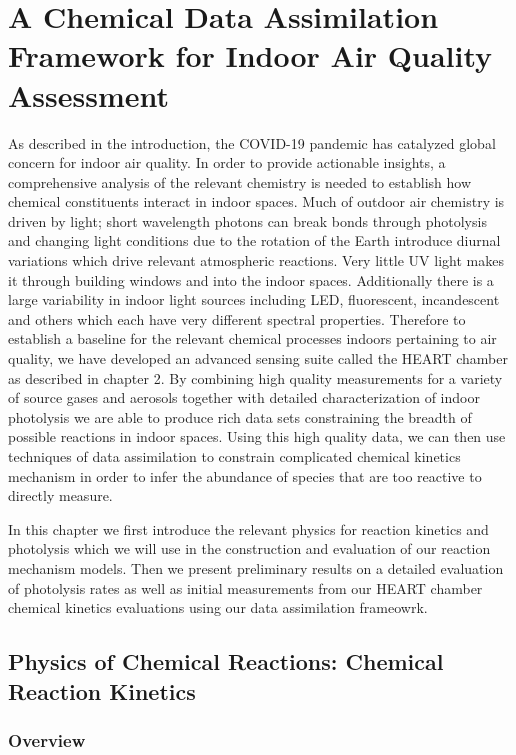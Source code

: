 \chapter{A Chemical Data Assimilation Framework for Indoor Air Quality Assessment}

As described in the introduction, the COVID-19 pandemic has catalyzed global concern for indoor air quality. In order to provide actionable insights, a comprehensive analysis of the relevant chemistry is needed to establish how chemical constituents interact in indoor spaces. Much of outdoor air chemistry is driven by light; short wavelength photons can break bonds through photolysis and changing light conditions due to the rotation of the Earth introduce diurnal variations which drive relevant atmospheric reactions. Very little UV light makes it through building windows and into the indoor spaces. Additionally there is a large variability in indoor light sources including LED, fluorescent, incandescent and others which each have very different spectral properties. Therefore to establish a baseline for the relevant chemical processes indoors pertaining to air quality, we have developed an advanced sensing suite called the HEART chamber as described in chapter 2. By combining high quality measurements for a variety of source gases and aerosols together with detailed characterization of indoor photolysis we are able to produce rich data sets constraining the breadth of possible reactions in indoor spaces. Using this high quality data, we can then use techniques of data assimilation to constrain complicated chemical kinetics mechanism in order to infer the abundance of species that are too reactive to directly measure.

In this chapter we first introduce the relevant physics for reaction kinetics and photolysis which we will use in the construction and evaluation of our reaction mechanism models. Then we present preliminary results on a detailed evaluation of photolysis rates as well as initial measurements from our HEART chamber chemical kinetics evaluations using our data assimilation frameowrk.

\section{Physics of Chemical Reactions: Chemical Reaction Kinetics}

\subsection{Overview}

